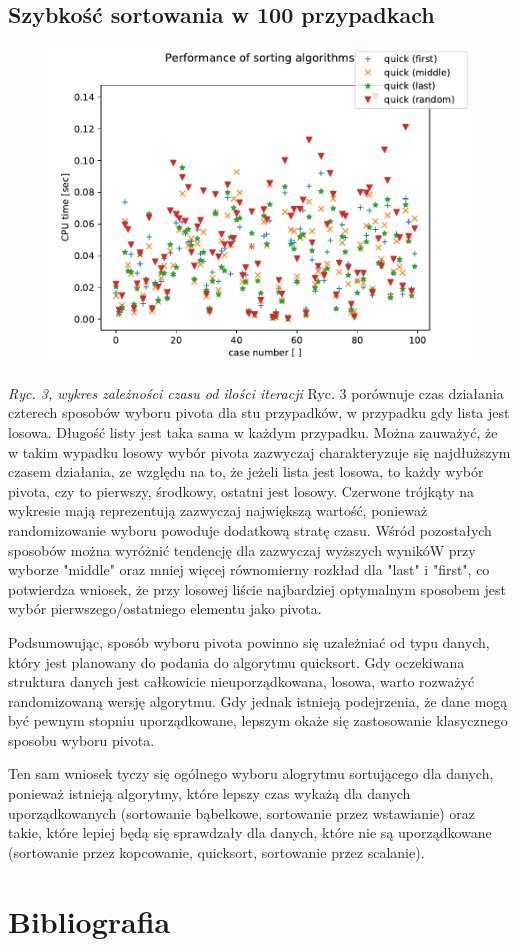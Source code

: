 \documentclass[a4paper,11pt]{report}
\begin{document}
\subsection{Szybkość sortowania w 100 przypadkach}
\begin{figure}[h!]
\centering
\includegraphics[scale=1]{Figure_2.pdf}
\end{figure}
\textit{Ryc. 3, wykres zależności czasu od ilości iteracji}
Ryc. 3 porównuje czas działania czterech sposobów wyboru pivota dla stu przypadków, w przypadku gdy lista jest losowa. Długość listy jest taka sama w każdym przypadku. Można zauważyć, że w takim wypadku losowy wybór pivota zazwyczaj charakteryzuje się najdłuższym czasem działania, ze względu na to, że jeżeli lista jest losowa, to każdy wybór pivota, czy to pierwszy, środkowy, ostatni jest losowy. Czerwone trójkąty na wykresie mają reprezentują zazwyczaj największą wartość, ponieważ randomizowanie wyboru powoduje dodatkową stratę czasu. Wśród pozostałych sposobów można wyróżnić tendencję dla zazwyczaj wyższych wynikóW przy wyborze "middle" oraz mniej więcej równomierny rozkład dla "last" i "first", co potwierdza wniosek, że przy losowej liście najbardziej optymalnym sposobem jest wybór pierwszego/ostatniego elementu jako pivota.



Podsumowując, sposób wyboru pivota powinno się uzależniać od typu danych, który jest planowany do podania do algorytmu quicksort. Gdy oczekiwana struktura danych jest całkowicie nieuporządkowana, losowa, warto rozważyć randomizowaną wersję algorytmu. Gdy jednak istnieją podejrzenia, że dane mogą być pewnym stopniu uporządkowane, lepszym okaże się zastosowanie klasycznego sposobu wyboru pivota.


Ten sam wniosek tyczy się ogólnego wyboru alogrytmu sortującego dla danych, ponieważ istnieją algorytmy, które lepszy czas wykażą dla danych uporządkowanych (sortowanie bąbelkowe, sortowanie przez wstawianie) oraz takie, które lepiej będą się sprawdzały dla danych, które nie są uporządkowane (sortowanie przez kopcowanie, quicksort, sortowanie przez scalanie).

\section{Bibliografia}
\nocite{*}


\end{document}
